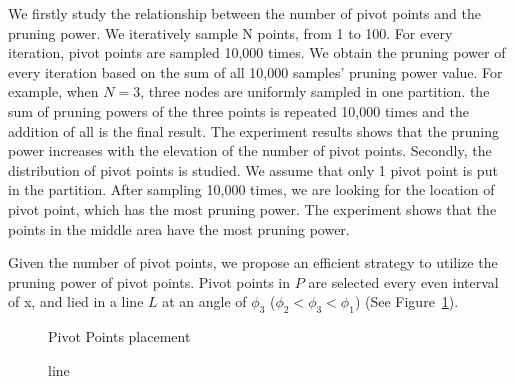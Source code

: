 We firstly study the relationship between the number of pivot points and the pruning power. We iteratively sample N points, from 1 to 100. For every iteration, pivot points are sampled 10,000 times. We obtain the pruning power of every iteration based on the sum of all 10,000 samples' pruning power value. For example, when $N=3$, three nodes are uniformly sampled in one partition. the sum of pruning powers of the three points is repeated 10,000 times and the addition of all is the final result. The experiment results shows that the pruning power increases with the elevation of the number of pivot points. Secondly, the distribution of pivot points is studied. We assume that only 1 pivot point is put in the partition. After sampling 10,000 times, we are looking for the location of pivot point, which has the most pruning power. The experiment shows that the points in the middle area have the most pruning power.  

Given the number of pivot points, we propose an efficient strategy to utilize the pruning power of pivot points. Pivot points in $P$ are selected every even interval of x, and lied in a line $L$ at an angle of $\phi_3$ ($ \phi_2 < \phi_3 < \phi_1 $) (See Figure~\ref{figure:midLine}).



\begin{figure}[!b]
\vspace{-15pt}
\centering
  \centerline{}
  \caption{Pivot Points placement}
  \vspace{-15pt}
  \label{figure:midLine}
\end{figure}

\begin{figure}[t]
\vspace{-15pt}
\centering
  \centerline{}
  \caption{line}
  \vspace{-15pt}
  \label{figure:testArea}
\end{figure}

